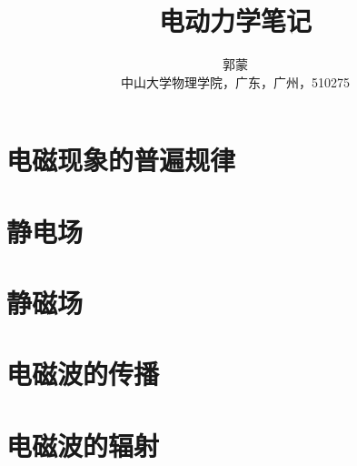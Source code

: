 \documentclass[10pt,oneside,UTF8]{book}
\title{\fontsize{30pt}{30pt}\textbf{电动力学笔记}}
\author
	{\kaishu 郭蒙 \\
	\kaishu 中山大学物理学院，广东，广州，510275} %
\date{}
\begin{document}
	\maketitle  %
\newpage
{}
\setcounter{page}{1}
\tableofcontents
\newpage
\setcounter{page}{1}
	\chapter{电磁现象的普遍规律}
		
	\chapter{静电场}
		
	\chapter{静磁场}
	
	\chapter{电磁波的传播}
		
	\chapter{电磁波的辐射}
		
		
	
\end{document}
